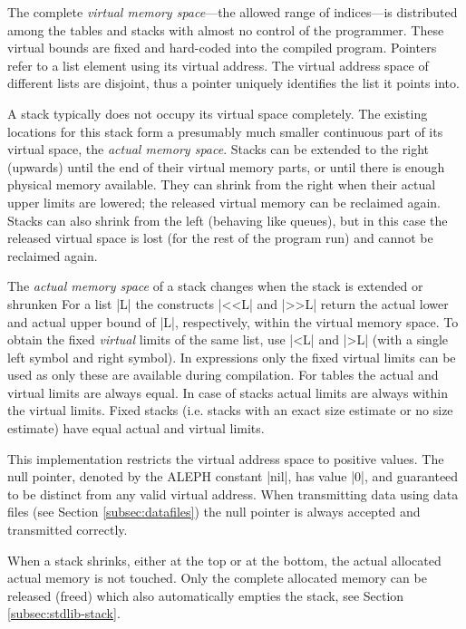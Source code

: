 \documentclass[titlepage]{article}
\newcommand\A{\textsf{ALEPH}}
\newcommand\g[1]{\textsf{\color{blue!90!black}#1}}
\begin{document}
The complete \emph{virtual memory space}---the allowed range of indices---is
distributed among the tables and stacks with almost no control of the
programmer. These virtual bounds are fixed and hard-coded into the compiled
program. Pointers refer to a list element using its virtual address.
The virtual address space of different lists are disjoint, thus a
pointer uniquely identifies the list it points into.

A stack typically does not occupy its virtual space completely. The existing
locations for this stack form a presumably much smaller continuous part of
its virtual space, the \emph{actual memory space}. Stacks can be
extended to the right (upwards) until the end of their virtual memory parts,
or until there is enough physical memory available. They can shrink from the
right when their actual upper limits are lowered; the released virtual
memory can be reclaimed again. Stacks can also shrink from the left
(behaving like queues), but in this case the released virtual space is lost
(for the rest of the program run) and cannot be reclaimed again.

The \emph{actual memory space} of a \g{stack} changes when the stack is
extended or shrunken For a list \pp|L| the constructs \pp|<<L| and \pp|>>L|
return the actual lower and actual upper bound of \pp|L|, respectively,
within the virtual memory space. To obtain the fixed \emph{virtual} limits
of the same list, use \pp|<L| and \pp|>L| (with a single \g{left symbol} and
\g{right symbol}). In expressions only the fixed virtual limits can be used
as only these are available during compilation.
%
For \g{table}s the actual and virtual limits are always equal. In case of
\g{stack}s actual limits are always within the virtual limits. Fixed stacks
(i.e. stacks with an exact size estimate or no size estimate) have
equal actual and virtual limits.

This implementation restricts the virtual address space to positive values.
The null pointer, denoted by the \A{} constant \pp|nil|, has value
\pp|0|, and guaranteed to be distinct from any valid virtual address.
When transmitting data using data files (see Section \ref{subsec:datafiles})
the null pointer is always accepted and transmitted correctly.

When a \g{stack} shrinks, either at the top or at the bottom, the actual
allocated actual memory is not touched. Only the complete allocated memory
can be released (freed) which also automatically empties the stack, see
Section \ref{subsec:stdlib-stack}.
\end{document}
